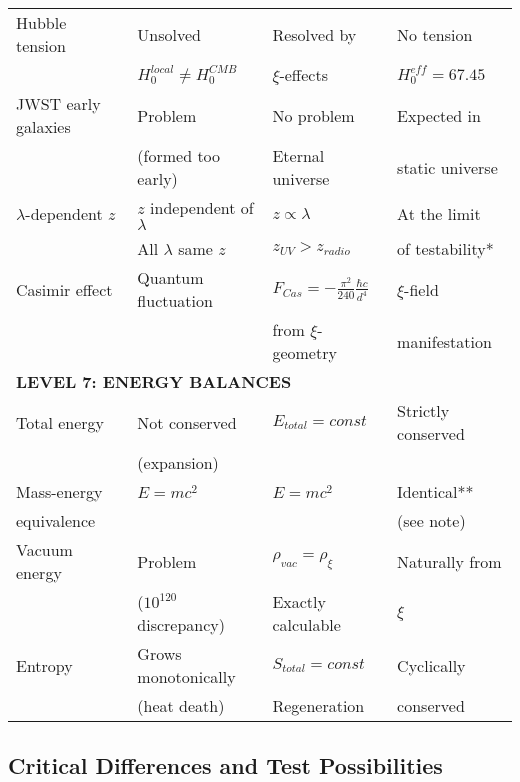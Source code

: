 \documentclass[12pt,a4paper]{article}
\begin{document}
\begin{longtable}{p{5cm}p{4cm}p{3.5cm}p{3.5cm}}
	Hubble tension & Unsolved & Resolved by & No tension \\
	& $H_0^{local} \neq H_0^{CMB}$ & $\xi$-effects & $H_0^{eff} = 67.45$ \\[0.3em]
	
	JWST early galaxies & Problem & No problem & Expected in \\
	& (formed too early) & Eternal universe & static universe \\[0.3em]
	
	$\lambda$-dependent $z$ & $z$ independent of $\lambda$ & $z \propto \lambda$ & At the limit \\
	& All $\lambda$ same $z$ & $z_{UV} > z_{radio}$ & of testability* \\[0.3em]
	
	Casimir effect & Quantum fluctuation & $F_{Cas} = -\frac{\pi^2}{240} \frac{\hbar c}{d^4}$ & $\xi$-field \\
	& & from $\xi$-geometry & manifestation \\[0.3em]
	
	\midrule
	\multicolumn{4}{l}{\textbf{LEVEL 7: ENERGY BALANCES}} \\
	\midrule
	
	Total energy & Not conserved & $E_{total} = const$ & Strictly conserved \\
	& (expansion) & & \\[0.3em]
	
	Mass-energy & $E = mc^2$ & $E = mc^2$ & Identical** \\
	equivalence & & & (see note) \\[0.3em]
	
	Vacuum energy & Problem & $\rho_{vac} = \rho_\xi$ & Naturally from \\
	& ($10^{120}$ discrepancy) & Exactly calculable & $\xi$ \\[0.3em]
	
	Entropy & Grows monotonically & $S_{total} = const$ & Cyclically \\
	& (heat death) & Regeneration & conserved \\[0.3em]
	
\end{longtable}

\subsection{Critical Differences and Test Possibilities}
\label{subsec:critical_differences}
\end{document}
